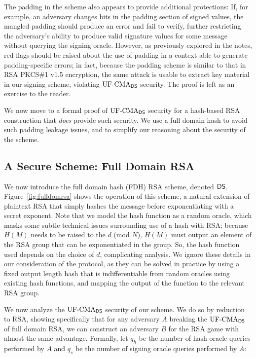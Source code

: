 The padding in the scheme also appears to provide additional protections: If, for example, an adversary changes bits in the padding section of signed values, the mangled padding should produce an error and fail to verify, further restricting the adversary's ability to produce valid signature values for some message without querying the signing oracle.  However, as previously explored in the notes, red flags should be raised about the use of padding in a context able to generate padding-specific errors; in fact, because the padding scheme is similar to that in RSA PKCS\#1 v1.5 encryption, the same attack is usable to extract key material in our signing scheme, violating $\textnormal{UF-CMA}_{{\mathsf{DS}}}$ security.  The proof is left as an exercise to the reader.

We now move to a formal proof of $\textnormal{UF-CMA}_{{\mathsf{DS}}}$ security for a hash-based RSA construction that \emph{does} provide such security.  We use a full domain hash to avoid such padding leakage issues, and to simplify our reasoning about the security of the scheme.

\subsection{A Secure Scheme: Full Domain RSA}


We now introduce the full domain hash (FDH) RSA scheme, denoted ${\mathsf{DS}}$.  Figure~\ref{fig:fulldomrsa} shows the operation of this scheme, a natural extension of plaintext RSA that simply hashes the message before exponentiating with a secret exponent.  Note that we model the hash function as a random oracle, which masks some subtle technical issues surrounding use of a hash with RSA; because $H(M)$ needs to be raised to the $d$ (mod $N$), $H(M)$ must output an element of the RSA group that can be exponentiated in the group.  So, the hash function used depends on the choice of $d$, complicating analysis.  We ignore these details in our consideration of the protocol, as they can be solved in practice by using a fixed output length hash that is indifferentiable from random oracles using existing hash functions, and mapping the output of the function to the relevant RSA group.

We now analyze the $\textnormal{UF-CMA}_{\mathsf{DS}}$ security of our scheme.  We do so by reduction to RSA, showing specifically that for any adversary $A$ breaking the $\textnormal{UF-CMA}_{\mathsf{DS}}$ of full domain RSA, we can construct an adversary $B$ for the RSA game with almost the same advantage.  Formally, let $q_h$ be the number of hash oracle queries performed by $A$ and $q_s$ be the number of signing oracle queries performed by $A$:

